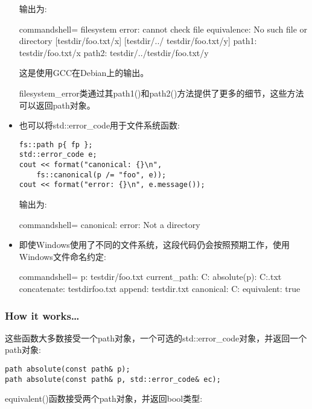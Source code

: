 \begin{itemize}
输出为:

\begin{tcblisting}{commandshell={}}
filesystem error: cannot check file equivalence: No
such file or directory [testdir/foo.txt/x] [testdir/../
testdir/foo.txt/y]
path1: testdir/foo.txt/x
path2: testdir/../testdir/foo.txt/y
\end{tcblisting}

这是使用GCC在Debian上的输出。

filesystem\_error类通过其path1()和path2()方法提供了更多的细节，这些方法可以返回path对象。

\item 
也可以将std::error\_code用于文件系统函数:

\begin{lstlisting}[style=styleCXX]
fs::path p{ fp };
std::error_code e;
cout << format("canonical: {}\n",
	fs::canonical(p /= "foo", e));
cout << format("error: {}\n", e.message());
\end{lstlisting}

输出为:

\begin{tcblisting}{commandshell={}}
canonical:
error: Not a directory
\end{tcblisting}

\item 
即使Windows使用了不同的文件系统，这段代码仍会按照预期工作，使用Windows文件命名约定:

\begin{tcblisting}{commandshell={}}
p: testdir/foo.txt
current_path: C:\Users\billw{}
absolute(p): C:\Users\billw{}\testdir\foo.txt
concatenate: testdirfoo.txt
append: testdir\foo.txt
canonical: C:\Users\billw{}\testdir
equivalent: true
\end{tcblisting}
\end{itemize}

\subsubsection{How it works…}

这些函数大多数接受一个path对象，一个可选的std::error\_code对象，并返回一个path对象:

\begin{lstlisting}[style=styleCXX]
path absolute(const path& p);
path absolute(const path& p, std::error_code& ec);
\end{lstlisting}

equivalent()函数接受两个path对象，并返回bool类型:

